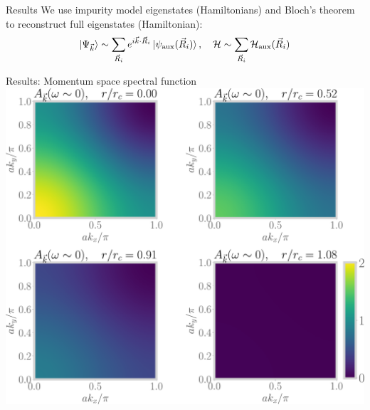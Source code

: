 \documentclass[aspectratio=169,t]{beamer}
\begin{document}
\begin{frame}{Results}
\flushleft
We use impurity model eigenstates (Hamiltonians) and \alert{Bloch's theorem} to reconstruct full eigenstates (Hamiltonian):
\[\ket{\Psi_{\vec k}} \sim \sum_{\vec R_i} e^{i \vec{k}\cdot\vec{R}_i} \ket{\psi_\text{aux}(\vec R_i)},\quad\mathcal{H} \sim \sum_{\vec R_i} \mathcal{H}_\text{aux}(\vec R_i)\]
\vspace*{\fill}
\end{frame}

\begin{frame}{Results: Momentum space spectral function}
\includegraphics[width=\textwidth]{kspace-spectralfunction-all.pdf}
\end{frame}
\end{document}
